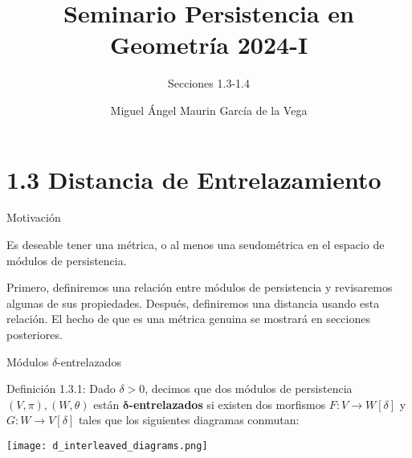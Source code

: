 \documentclass{beamer}
\title{Seminario Persistencia en Geometría 2024-I}
\subtitle{Secciones 1.3-1.4}
\author{Miguel Ángel Maurin García de la Vega}
\begin{document}
\frenchspacing


  \frame{\maketitle}


    \section{1.3 Distancia de Entrelazamiento}

    \begin{frame}{Motivación}

Es deseable tener una métrica, o al menos una seudométrica en el espacio de módulos de persistencia.  

Primero, definiremos una relación entre módulos de persistencia y revisaremos algunas de sus propiedades. Después, definiremos una distancia usando esta relación. El hecho de que es una métrica genuina se mostrará en secciones posteriores. 
 

\end{frame}
    
\begin{frame}{Módulos $\delta$-entrelazados}

\begin{block}{Definición 1.3.1:}
Dado \(\delta>0\), decimos que dos módulos de persistencia \((V,\pi), (W,\theta)\) están \textbf{\(\boldsymbol{\delta}\)-entrelazados} si existen dos morfismos \(F:V \to W[\delta]\) y \(G:W \to V[\delta]\) tales que los siguientes diagramas conmutan:
\end{block}

\pause
\begin{center}
    \texttt{[image: d\_interleaved\_diagrams.png]}
\end{center}

\end{frame}
\end{document}
